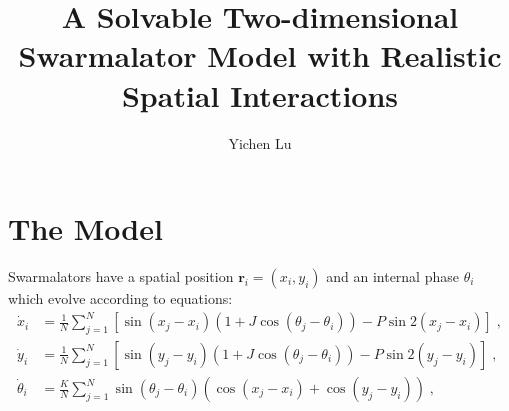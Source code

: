 \documentclass{article}
\title{\textbf{A Solvable Two-dimensional Swarmalator Model with Realistic Spatial Interactions}}
\author{Yichen Lu}
\begin{document}
\maketitle

\tableofcontents

\newpage
\section{\label{sec:model}The Model}

Swarmalators have a spatial position $\mathbf{r}_i=\left( x_i, y_i \right)$ and an internal phase $\theta_i$ which evolve according to equations:
\begin{subequations}
    \label{eq:totalDynamics}
    \begin{align}
        \dot{x}_i&=\frac{1}{N}\sum_{j=1}^N{\left[ \sin \left( x_j-x_i \right) \left( 1+J\cos \left( \theta _j-\theta _i \right) \right) -P\sin 2\left( x_j-x_i \right) \right]}\;,\\
        \dot{y}_i&=\frac{1}{N}\sum_{j=1}^N{\left[ \sin \left( y_j-y_i \right) \left( 1+J\cos \left( \theta _j-\theta _i \right) \right) -P\sin 2\left( y_j-y_i \right) \right]}\;,\\
        \dot{\theta}_i&=\frac{K}{N}\sum_{j=1}^N{\sin \left( \theta _j-\theta _i \right) \left( \cos \left( x_j-x_i \right) +\cos \left( y_j-y_i \right) \right)}\;,
    \end{align}
\end{subequations}
\end{document}
